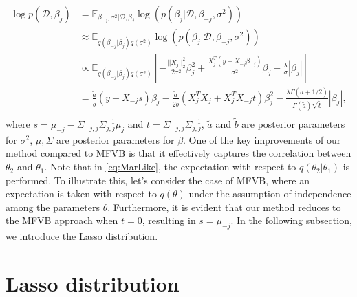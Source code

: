 \begin{equation}
	\label{eq:MarLike}
	\begin{aligned}
		\log p(\mathcal{D},\beta_j) &= \mathbb{E}_{\beta_{-j},\sigma^2|\mathcal{D},\beta_j} 	\log(p(\beta_j|\mathcal{D},\beta_{-j},\sigma^2))\\
		& \approx \mathbb{E}_{q(\beta_{-j}|\beta_j)q(\sigma^2)}
		\log(p(\beta_j|\mathcal{D},\beta_{-j},\sigma^2))\\
		& \propto \mathbb{E}_{q(\beta_{-j}|\beta_j)q(\sigma^2)}\left[-\frac{||X_j||_2^2}{2\sigma^2}\beta_j^2 + \frac{X_j^T(y - X_{-j}\beta_{-j})}{\sigma^2}\beta_j - \frac{\lambda}{\sigma}|\beta_j|\right]\\
		&= \frac{\tilde{a}}{\tilde{b}}(y - X_{-j}s)\beta_j - \frac{\tilde{a}}{2\tilde{b}}(X_j^TX_j+X_j^TX_{-j}t)\beta_j^2 - \frac{\lambda \Gamma(\tilde{a}+1/2)}{\Gamma(\tilde{a})\sqrt{\tilde{b}}}|\beta_j|,\\
	\end{aligned}
\end{equation}
where $s = \mu_{-j} - \Sigma_{-j,j}\Sigma_{j,j}^{-1}\mu_j$ and $t = \Sigma_{-j,j}\Sigma_{j,j}^{-1}$, $\tilde{a}$ and $\tilde{b}$ are posterior parameters for $\sigma^2$, $\mu,\Sigma$ are posterior parameters for $\beta$.
One of the key improvements of our method compared to MFVB is that it effectively captures the correlation between $\theta_2$ and $\theta_1$. Note that in \autoref{eq:MarLike}, the expectation with respect to $q(\theta_2|\theta_1)$ is performed. 
To illustrate this, let's consider the case of MFVB, where an expectation is taken with respect to $q(\theta)$ under the assumption of independence among the parameters $\theta$. Furthermore, it is evident that our method reduces to the MFVB approach when $t = 0$, resulting in $s = \mu_{-j}$. In the following subsection, we introduce the Lasso distribution.

\section{Lasso distribution}

